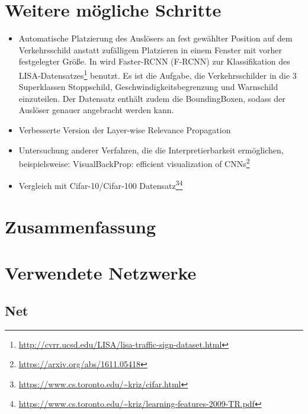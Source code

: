 \documentclass[twoside, 12pt,a4paper]{article}
\numberwithin{equation}{section}
\begin{document}
	\section{Weitere mögliche Schritte} \label{chapter_weitereSchritte}
	\begin{itemize}
		\item Automatische Platzierung des Auslösers an fest gewählter Position auf dem Verkehrsschild anstatt zufälligem Platzieren in einem Fenster mit vorher festgelegter Größe. In \cite{badnets} wird  Faster-RCNN (F-RCNN) zur Klassifikation des LISA-Datensatzes\footnote{\url{http://cvrr.ucsd.edu/LISA/lisa-traffic-sign-dataset.html}} benutzt. Es ist die Aufgabe, die Verkehrsschilder in die 3 Superklassen Stoppschild, Geschwindigkeitsbegrenzung und Warnschild einzuteilen. Der Datensatz enthält zudem die BoundingBoxen, sodass der Auslöser genauer angebracht werden kann.
		\item Verbesserte Version der Layer-wise Relevance Propagation
		\item Untersuchung anderer Verfahren, die die Interpretierbarkeit ermöglichen, beispielsweise: VisualBackProp: efficient visualization of CNNs\footnote{\url{https://arxiv.org/abs/1611.05418}}
		\item Vergleich mit Cifar-10/Cifar-100 Datensatz\footnote{\url{https://www.cs.toronto.edu/~kriz/cifar.html}}\footnote{\url{https://www.cs.toronto.edu/~kriz/learning-features-2009-TR.pdf}}
	\end{itemize}


	\section{Zusammenfassung} \label{chapter_conclusion}
	
	\printglossaries
	\newpage
	\appendix
	\section{Verwendete Netzwerke}
	\subsection{Net}
	
\end{document}
